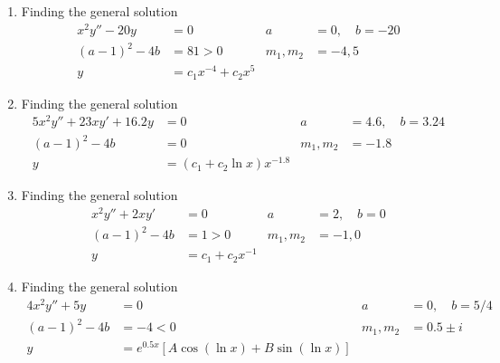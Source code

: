 \begin{enumerate}
    \item Finding the general solution
          \begin{align}
              x^{2}y'' -20y & = 0                        &
              a             & = 0, \quad b= -20            \\
              (a-1)^{2}-4b  & = 81 > 0                   &
              m_{1}, m_{2}  & = -4, 5                      \\
              y             & = c_{1}x^{-4} + c_{2}x^{5}
          \end{align}

    \item Finding the general solution
          \begin{align}
              5x^{2}y'' + 23xy' + 16.2y & = 0                             &
              a                         & = 4.6, \quad b= 3.24              \\
              (a-1)^{2}-4b              & = 0                             &
              m_{1}, m_{2}              & = -1.8                            \\
              y                         & = (c_{1} + c_{2}\ln x )x^{-1.8}
          \end{align}

    \item Finding the general solution
          \begin{align}
              x^{2}y'' + 2xy' & = 0                   &
              a               & = 2, \quad b= 0         \\
              (a-1)^{2}-4b    & = 1 > 0               &
              m_{1}, m_{2}    & = -1, 0                 \\
              y               & = c_{1} + c_{2}x^{-1}
          \end{align}

    \item Finding the general solution
          \begin{align}
              4x^{2}y'' + 5y & = 0                                     &
              a              & = 0, \quad b= 5/4                         \\
              (a-1)^{2}-4b   & = -4 < 0                                &
              m_{1}, m_{2}   & = 0.5 \pm i                               \\
              y              & = e^{0.5x}[A\cos(\ln x) + B\sin(\ln x)]
          \end{align}


\end{enumerate}
